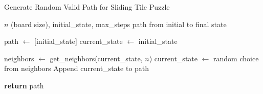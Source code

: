 \begin{algorithm}
\caption{Generate Random Valid Path for Sliding Tile Puzzle}
\label{alg:random_agent}
\begin{algorithmic}
    \REQUIRE $n$ (board size), initial\_state, max\_steps
    \ENSURE path from initial to final state
    
    \STATE path $\gets$ [initial\_state]
    \STATE current\_state $\gets$ initial\_state
    
        \STATE neighbors $\gets$ get\_neighbors(current\_state, $n$)
        \STATE current\_state $\gets$ random choice from neighbors
        \STATE Append current\_state to path
    \ENDFOR
    
    \STATE \textbf{return} path

\end{algorithmic}
\end{algorithm}
